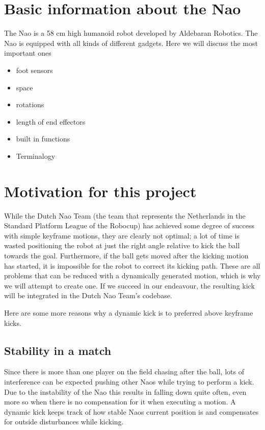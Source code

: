 \documentclass[a4paper]{article}
\begin{document}
\section{Basic information about the Nao}
The Nao is a 58 cm high humanoid robot developed by Aldebaran Robotics. The Nao
is equipped with all kinds of different gadgets. Here we will discuss the most
important ones 
\begin{itemize}
    \item foot sensors
    \item space
    \item rotations
    \item length of end effectors
    \item built in functions
    \item Terminalogy
\end{itemize}


\section{Motivation for this project} 
While the Dutch Nao Team\cite{DNT2012} (the team that represents the Netherlands
in the Standard Platform League of the Robocup) has achieved some degree of
success with simple keyframe motions, they are clearly not optimal; a lot of
time is wasted positioning the robot at just the right angle relative to kick
the ball towards the goal. Furthermore, if the ball gets moved after the kicking
motion has started, it is impossible for the robot to correct its kicking path. These are all problems that can be reduced with a dynamically generated motion, which is why we will attempt to create one. If we succeed in our endeavour, the resulting kick will be integrated in the Dutch Nao Team's codebase.

Here are some more reasons why a dynamic kick is to preferred above keyframe
kicks.

\subsection{Stability in a match}
Since there is more than one player on
the field  chasing after the ball,
lots of interference can be expected pushing other Naos while trying to perform a kick. Due to the
instability of the Nao this results in falling down quite often, even more
so when there is no compensation for it when executing a motion. A dynamic
kick keeps track of how stable Naos current position is and compensates for
outside disturbances while kicking. 
\end{document}
